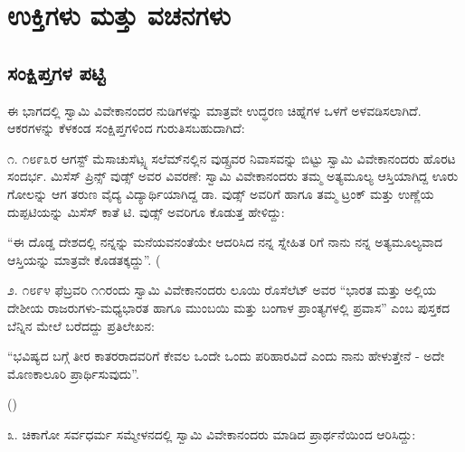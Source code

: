 


\part{ಉಕ್ತಿಗಳು ಮತ್ತು ವಚನಗಳು}

\chapter{ಸಂಕ್ಷಿಪ್ತಗಳ ಪಟ್ಟಿ}

ಈ ಭಾಗದಲ್ಲಿ ಸ್ವಾಮಿ ವಿವೇಕಾನಂದರ ನುಡಿಗಳನ್ನು ಮಾತ್ರವೇ ಉದ್ಧರಣ ಚಿಹ್ನೆಗಳ ಒಳಗೆ ಅಳವಡಿಸಲಾಗಿದೆ. ಆಕರಗಳನ್ನು ಕೆಳಕಂಡ ಸಂಕ್ಷಿಪ್ತಗಳಿಂದ ಗುರುತಿಸಬಹುದಾಗಿದೆ:





೧. ೧೮೯೩ರ ಆಗಸ್ಟ್ ಮೆಸಾಚುಸೆಟ್ಸ್ನ ಸಲೆಮ್​ನಲ್ಲಿನ ವುಡ್ಸ್ರವರ ನಿವಾಸವನ್ನು ಬಿಟ್ಟು ಸ್ವಾಮಿ ವಿವೇಕಾನಂದರು ಹೊರಟ ಸಂದರ್ಭ. ಮಿಸೆಸ್ ಪ್ರಿನ್ಸ್ ವುಡ್ಸ್ ಅವರ ವಿವರಣೆ: ಸ್ವಾಮಿ ವಿವೇಕಾನಂದರು ತಮ್ಮ ಅತ್ಯಮೂಲ್ಯ ಆಸ್ತಿಯಾಗಿದ್ದ ಊರು ಗೋಲನ್ನು ಆಗ ತರುಣ ವೈದ್ಯ ವಿದ್ಯಾರ್ಥಿಯಾಗಿದ್ದ ಡಾ. ವುಡ್ಸ್ ಅವರಿಗೆ ಹಾಗೂ ತಮ್ಮ ಟ್ರಂಕ್ ಮತ್ತು ಉಣ್ಣೆಯ ದುಪ್ಪಟಿಯನ್ನು ಮಿಸೆಸ್ ಕಾತೆ ಟಿ. ವುಡ್ಸ್ ಅವರಿಗೂ ಕೊಡುತ್ತ ಹೇಳಿದ್ದು:

“ಈ ದೊಡ್ಡ ದೇಶದಲ್ಲಿ ನನ್ನನ್ನು ಮನೆಯವನಂತೆಯೇ ಆದರಿಸಿದ ನನ್ನ ಸ್ನೇಹಿತ ರಿಗೆ ನಾನು ನನ್ನ ಅತ್ಯಮೂಲ್ಯವಾದ ಆಸ್ತಿಯನ್ನು ಮಾತ್ರವೇ ಕೊಡತಕ್ಕದ್ದು”. (

೨. ೧೮೯೪ ಫೆಬ್ರವರಿ ೧೧ರಂದು ಸ್ವಾಮಿ ವಿವೇಕಾನಂದರು ಲೂಯಿ ರೊಸೆಲೆಟ್ ಅವರ “ಭಾರತ ಮತ್ತು ಅಲ್ಲಿಯ ದೇಶೀಯ ರಾಜರುಗಳು-ಮಧ್ಯಭಾರತ ಹಾಗೂ ಮುಂಬಯಿ ಮತ್ತು ಬಂಗಾಳ ಪ್ರಾಂತ್ಯಗಳಲ್ಲಿ ಪ್ರವಾಸ” ಎಂಬ ಪುಸ್ತಕದ ಬೆನ್ನಿನ ಮೇಲೆ ಬರೆದದ್ದು ಪ್ರತಿಲೇಖನ:

“ಭವಿಷ್ಯದ ಬಗ್ಗೆ ತೀರ ಕಾತರರಾದವರಿಗೆ ಕೇವಲ ಒಂದೇ ಒಂದು ಪರಿಹಾರವಿದೆ ಎಂದು ನಾನು ಹೇಳುತ್ತೇನೆ - ಅದೇ ಮೊಣಕಾಲೂರಿ ಪ್ರಾರ್ಥಿಸುವುದು”.

()

೩. ಚಿಕಾಗೋ ಸರ್ವಧರ್ಮ ಸಮ್ಮೇಳನದಲ್ಲಿ ಸ್ವಾಮಿ ವಿವೇಕಾನಂದರು ಮಾಡಿದ ಪ್ರಾರ್ಥನೆಯಿಂದ ಆರಿಸಿದ್ದು:

